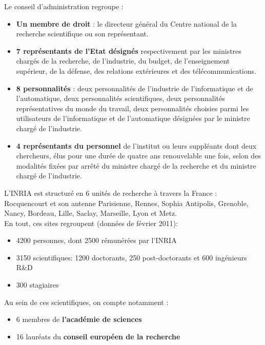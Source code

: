 \documentclass[a4paper, 11pt]{report}
\begin{document}
    Le conseil d'administration regroupe :
    \begin{itemize}
      \item \textbf{Un membre de droit} : le directeur général du Centre national de
        la recherche scientifique ou son représentant.
      \item \textbf{7 représentants de l'Etat désignés} respectivement par les
        ministres chargés de la recherche, de l'industrie, du budget, de
        l'enseignement supérieur, de la défense, des relations extérieures et
        des télécommunications.
      \item \textbf{8 personnalités} : deux personnalités de l'industrie de
        l'informatique et de l'automatique, deux personnalités scientifiques,
        deux personnalités représentatives du monde du travail, deux
        personnalités choisies parmi les utilisateurs de l'informatique et de
        l'automatique désignées par le ministre chargé de l'industrie.
      \item \textbf{4 représentants du personnel} de l'institut ou leurs
        suppléants dont deux chercheurs, élus pour une durée de quatre ans
        renouvelable une fois, selon des modalités fixées par arrêté du
        ministre chargé de la recherche et du ministre chargé de l'industrie.
    \end{itemize}

    L'INRIA est structuré en 6 unités de recherche à travers la France :
    Rocquencourt et son antenne Parisienne, Rennes, Sophia Antipolis, Grenoble,
    Nancy, Bordeau, Lille, Saclay, Marseille, Lyon et Metz. \\

    En tout, ces sites regroupent (données de février 2011):
    \begin{itemize}
      \item 4200 personnes, dont 2500 rémunérées par l'INRIA
      \item 3150 scientifiques: 1200 doctorants, 250 post-doctorants et 600
        ingénieurs R\&D
      \item 300 stagiaires
    \end{itemize}
    Au sein de ces scientifiques, on compte notamment :
    \begin{itemize}
      \item 6 membres de \textbf{l'académie de sciences}
      \item 16 lauréats du \textbf{conseil européen de la recherche}
    \end{itemize}
\end{document}
